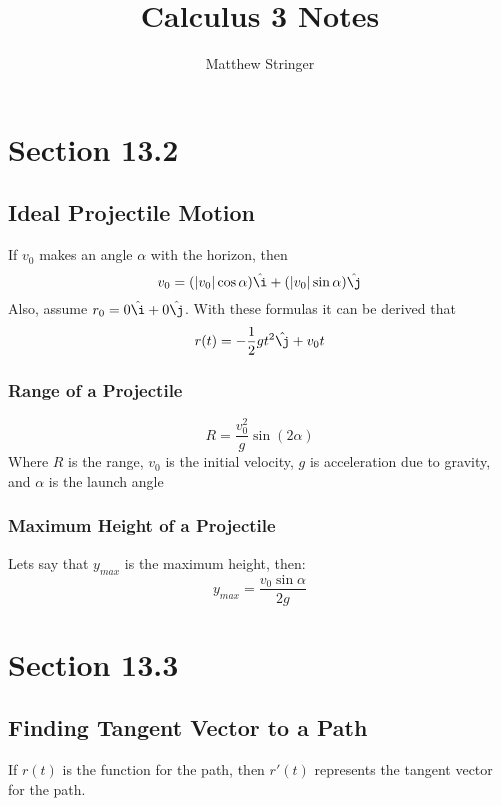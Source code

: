 \documentclass[12pt]{article}
\title{Calculus 3 Notes} %
\date{}
\author{Matthew Stringer} %
\theoremstyle{break}
\numberwithin{theorem}{subsection}
\numberwithin{lemma}{subsection}
\numberwithin{corollary}{subsection}
\numberwithin{equation}{subsection}
\newcommand{\ihat}{\hat \i}
\newcommand{\jhat}{\hat \j}
\begin{document}
\maketitle
\tableofcontents
\newpage

\section{Section 13.2}

\subsection{Ideal Projectile Motion}
If $v_0$ makes an angle $\alpha$ with the horizon, then 
\begin{equation*}
v_0 = (|v_0|\cos \alpha){\ihat} + (|v_0|\sin \alpha){\jhat}
\end{equation*}
Also, assume $r_0 = 0{\ihat} + 0{\hat \j}$. With these formulas it can be derived that
\begin{equation*}
r(t) = -\frac12 gt^2 {\hat \j} + v_0t
\end{equation*}

\subsubsection{Range of a Projectile}
\begin{equation*}
R = \frac{v_0^2}{g} \sin (2\alpha)
\end{equation*}
Where $R$ is the range, $v_0$ is the initial velocity, $g$ is acceleration due to gravity, and 
$\alpha$ is the launch angle

\subsubsection{Maximum Height of a Projectile}
Lets say that $y_{max}$ is the maximum height, then:
\begin{equation*}
	y_{max} = \frac{v_0 \sin \alpha}{2g}
\end{equation*}

\section{Section 13.3}

\subsection{Finding Tangent Vector to a Path}
If $r(t)$ is the function for the path, then $r'(t)$ represents the tangent vector for the path.
\end{document}
